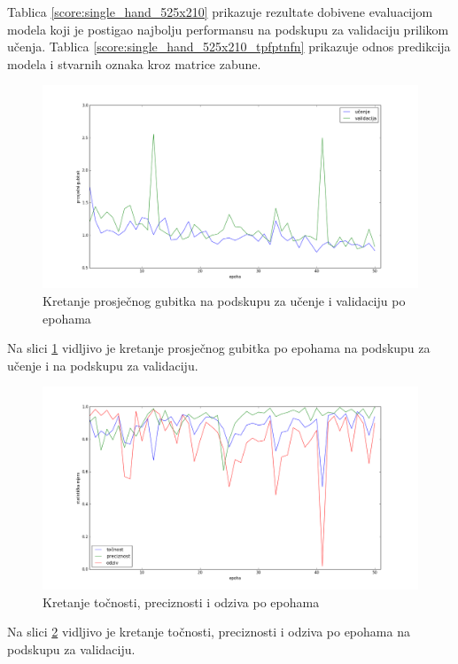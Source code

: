 \documentclass[times, utf8, diplomski, numeric]{fer}
\begin{document}
\noindent Tablica \ref{score:single_hand_525x210} prikazuje rezultate dobivene evaluacijom modela koji je postigao najbolju performansu na podskupu za validaciju prilikom učenja.
Tablica \ref{score:single_hand_525x210_tpfptnfn} prikazuje odnos predikcija modela i stvarnih oznaka kroz matrice zabune.

\begin{figure}[H]
\centering
\includegraphics[scale=0.35]{images/single_hand_scale075_loss.png}
\caption{Kretanje prosječnog gubitka na podskupu za učenje i validaciju po epohama}
\label{img:single_hand_scale075_loss}
\end{figure}
\noindent Na slici \ref{img:single_hand_scale075_loss} vidljivo je kretanje prosječnog gubitka po epohama na podskupu za učenje i na podskupu za validaciju.

\begin{figure}[H]
\centering
\includegraphics[scale=0.35]{images/single_hand_scale075_acc_ap.png}
\caption{Kretanje točnosti, preciznosti i odziva po epohama}
\label{img:single_hand_scale075_acc_ap}
\end{figure}
\noindent Na slici \ref{img:single_hand_scale075_acc_ap} vidljivo je kretanje točnosti, preciznosti i odziva po epohama na podskupu za validaciju.
\end{document}

